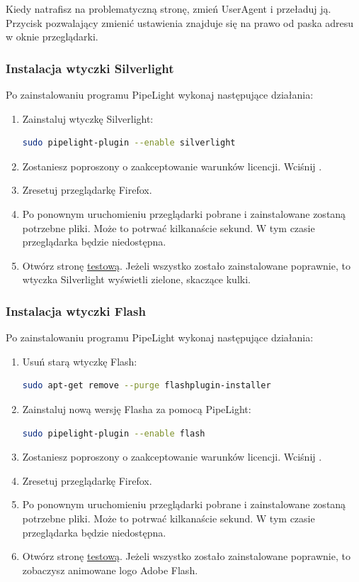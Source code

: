 Kiedy natrafisz na problematyczną stronę, zmień UserAgent i przeładuj ją. Przycisk pozwalający zmienić ustawienia znajduje się na prawo od paska adresu w oknie przeglądarki.

\subsubsection{Instalacja wtyczki Silverlight}
\noindent Po zainstalowaniu programu PipeLight wykonaj następujące działania:
\begin{enumerate}
\item Zainstaluj wtyczkę Silverlight:
\begin{lstlisting}[language=bash]
sudo pipelight-plugin --enable silverlight
\end{lstlisting}
\item Zostaniesz poproszony o zaakceptowanie warunków licencji. Wciśnij .
\item Zresetuj przeglądarkę Firefox.
\item Po ponownym uruchomieniu przeglądarki pobrane i zainstalowane zostaną potrzebne pliki. Może to potrwać kilkanaście sekund. W tym czasie przeglądarka będzie niedostępna.
\item Otwórz stronę \href{http://bubblemark.com/silverlight2.html}{testową}. Jeżeli wszystko zostało zainstalowane poprawnie, to wtyczka Silverlight wyświetli zielone, skaczące kulki.
\end{enumerate}

\subsubsection{Instalacja wtyczki Flash}
\noindent Po zainstalowaniu programu PipeLight wykonaj następujące działania:
\begin{enumerate}
\item Usuń starą wtyczkę Flash:
\begin{lstlisting}[language=bash]
sudo apt-get remove --purge flashplugin-installer
\end{lstlisting}
\item Zainstaluj nową wersję Flasha za pomocą PipeLight:
\begin{lstlisting}[language=bash]
sudo pipelight-plugin --enable flash
\end{lstlisting}
\item Zostaniesz poproszony o zaakceptowanie warunków licencji. Wciśnij .
\item Zresetuj przeglądarkę Firefox.
\item Po ponownym uruchomieniu przeglądarki pobrane i zainstalowane zostaną potrzebne pliki. Może to potrwać kilkanaście sekund. W tym czasie przeglądarka będzie niedostępna.
\item Otwórz stronę \href{https://www.adobe.com/software/flash/about/}{testową}. Jeżeli wszystko zostało zainstalowane poprawnie, to zobaczysz animowane logo Adobe Flash.
\end{enumerate}


